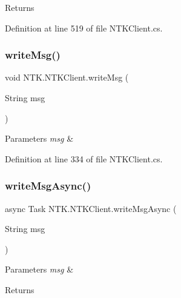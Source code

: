 \begin{DoxyReturn}{Returns}

\end{DoxyReturn}


Definition at line 519 of file N\+T\+K\+Client.\+cs.

\mbox{\label{class_n_t_k_1_1_n_t_k_client_ab1c347a28f74f6e249da9e703c0d335b}} 
\subsubsection{\texorpdfstring{writeMsg()}{writeMsg()}}
{\footnotesize\ttfamily void N\+T\+K.\+N\+T\+K\+Client.\+write\+Msg (\begin{DoxyParamCaption}\item[{String}]{msg }\end{DoxyParamCaption})}






\begin{DoxyParams}{Parameters}
{\em msg} & \\
\hline
\end{DoxyParams}


Definition at line 334 of file N\+T\+K\+Client.\+cs.

\mbox{\label{class_n_t_k_1_1_n_t_k_client_aed6b5427a784b45ba4b08e290a8f1800}} 
\subsubsection{\texorpdfstring{writeMsgAsync()}{writeMsgAsync()}}
{\footnotesize\ttfamily async Task N\+T\+K.\+N\+T\+K\+Client.\+write\+Msg\+Async (\begin{DoxyParamCaption}\item[{String}]{msg }\end{DoxyParamCaption})}






\begin{DoxyParams}{Parameters}
{\em msg} & \\
\hline
\end{DoxyParams}
\begin{DoxyReturn}{Returns}

\end{DoxyReturn}


